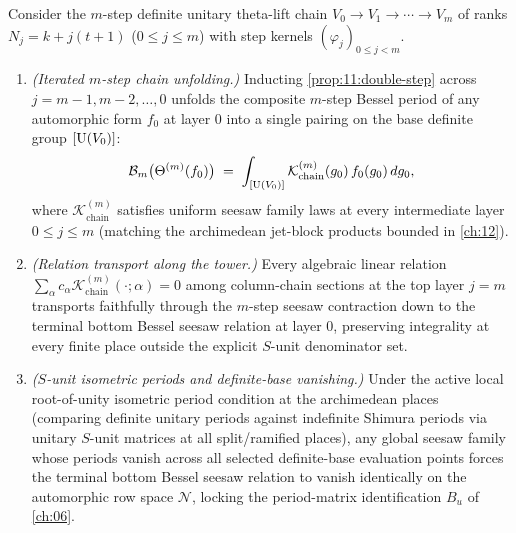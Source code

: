 \begin{theorem}
\label{thm:11:seesaw-chain}
Consider the $m$-step definite unitary theta-lift chain $V_0 \to V_1 \to \cdots \to V_m$ of ranks $N_j = k + j(t+1)$ ($0 \le j \le m$) with step kernels $(\varphi_j)_{0 \le j < m}$.
\begin{enumerate}[label=\textup{(\roman*)}]
\item \emph{(Iterated $m$-step chain unfolding.)} Inducting \cref{prop:11:double-step} across $j = m-1, m-2, \dots, 0$ unfolds the composite $m$-step Bessel period of any automorphic form $f_0$ at layer $0$ into a single pairing on the base definite group $[\mathrm{U}(V_0)]$:
  \begin{equation}
  \label{eq:11:m-step-unfold}
    \mathcal{B}_m\bigl(\Theta^{(m)}(f_0)\bigr)
    \;=\; \int_{[\mathrm{U}(V_0)]} \mathcal{K}_{\mathrm{chain}}^{(m)}(g_0)\, f_0(g_0)\, dg_0,
  \end{equation}
  where $\mathcal{K}_{\mathrm{chain}}^{(m)}$ satisfies uniform seesaw family laws at every intermediate layer $0 \le j \le m$ (matching the archimedean jet-block products bounded in \cref{ch:12}).
\item \emph{(Relation transport along the tower.)} Every algebraic linear relation $\sum_\alpha c_\alpha \mathcal{K}_{\mathrm{chain}}^{(m)}(\cdot; \alpha) = 0$ among column-chain sections at the top layer $j = m$ transports faithfully through the $m$-step seesaw contraction down to the terminal bottom Bessel seesaw relation at layer $0$, preserving integrality at every finite place outside the explicit $S$-unit denominator set.
\item \emph{($S$-unit isometric periods and definite-base vanishing.)} Under the active local root-of-unity isometric period condition at the archimedean places (comparing definite unitary periods against indefinite Shimura periods via unitary $S$-unit matrices at all split/ramified places), any global seesaw family whose periods vanish across all selected definite-base evaluation points forces the terminal bottom Bessel seesaw relation to vanish identically on the automorphic row space $\mathcal{N}$, locking the period-matrix identification $B_u$ of \cref{ch:06}.
\end{enumerate}
\end{theorem}

